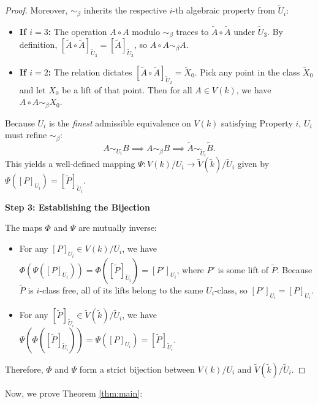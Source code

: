 \documentclass[11pt]{article}
\theoremstyle{definition}
\begin{document}
\begin{proof}
Moreover, $\sim_\beta$ inherits the respective $i$-th algebraic property from $\tilde{U}_i$:
\begin{itemize}
    \item \textbf{If $i = 3$:} The operation $A \circ A$ modulo $\sim_\beta$ traces to $\tilde{A} \circ \tilde{A}$ under $\tilde{U}_3$. By definition, $[\tilde{A} \circ \tilde{A}]_{\tilde{U}_3} = [\tilde{A}]_{\tilde{U}_3}$, so $A \circ A \sim_\beta A$.
    \item \textbf{If $i = 2$:} The relation dictates $[\tilde{A} \circ \tilde{A}]_{\tilde{U}_2} = \tilde{X}_0$. Pick any point in the class $\tilde{X}_0$ and let $X_0$ be a lift of that point. Then for all $A \in V(k)$, we have $A \circ A \sim_\beta X_0$.
\end{itemize}
Because $U_i$ is the \emph{finest} admissible equivalence on $V(k)$ satisfying Property $i$, $U_i$ must refine $\sim_\beta$:
\[ A \sim_{U_i} B \implies A \sim_\beta B \implies \tilde{A} \sim_{\tilde{U}_i} \tilde{B}. \]
This yields a well-defined mapping $\Psi: V(k)/U_i \to \tilde{V}(\tilde{k})/\tilde{U}_i$ given by $\Psi([P]_{U_i}) = [\tilde{P}]_{\tilde{U}_i}$.

\vspace{0.5em}
\noindent\textbf{Step 3: Establishing the Bijection}

The maps $\Phi$ and $\Psi$ are mutually inverse:
\begin{itemize}
    \item For any $[P]_{U_i} \in V(k)/U_i$, we have $\Phi(\Psi([P]_{U_i})) = \Phi([\tilde{P}]_{\tilde{U}_i}) = [P']_{U_i}$, where $P'$ is some lift of $\tilde{P}$. Because $\tilde{P}$ is $i$-class free, all of its lifts belong to the same $U_i$-class, so $[P']_{U_i} = [P]_{U_i}$.
    \item For any $[\tilde{P}]_{\tilde{U}_i} \in \tilde{V}(\tilde{k})/\tilde{U}_i$, we have $\Psi(\Phi([\tilde{P}]_{\tilde{U}_i})) = \Psi([P]_{U_i}) = [\tilde{P}]_{\tilde{U}_i}$.
\end{itemize}
Therefore, $\Phi$ and $\Psi$ form a strict bijection between $V(k)/U_i$ and $\tilde{V}(\tilde{k})/\tilde{U}_i$.
\end{proof}

Now, we prove Theorem \ref{thm:main}:

\MainResultOne*
\end{document}
